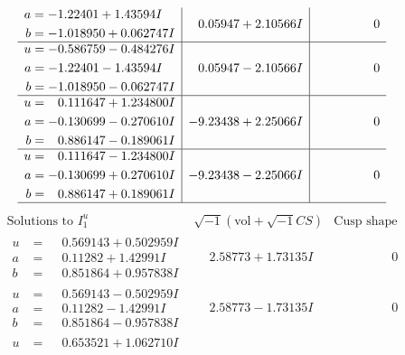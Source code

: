 \documentclass[1p]{elsarticle_modified}
\theoremstyle{definition}
\newcommand{\I}{\sqrt{-1}}
\begin{document}
$$\begin{array}{c|c|c}
\begin{aligned}
a &= -1.22401 + 1.43594 I \\
b &= -1.018950 + 0.062747 I\end{aligned}
 & \phantom{-}0.05947 + 2.10566 I & \phantom{-0.000000 } 0 \\ \hline\begin{aligned}
u &= -0.586759 - 0.484276 I \\
a &= -1.22401 - 1.43594 I \\
b &= -1.018950 - 0.062747 I\end{aligned}
 & \phantom{-}0.05947 - 2.10566 I & \phantom{-0.000000 } 0 \\ \hline\begin{aligned}
u &= \phantom{-}0.111647 + 1.234800 I \\
a &= -0.130699 - 0.270610 I \\
b &= \phantom{-}0.886147 - 0.189061 I\end{aligned}
 & -9.23438 + 2.25066 I & \phantom{-0.000000 } 0 \\ \hline\begin{aligned}
u &= \phantom{-}0.111647 - 1.234800 I \\
a &= -0.130699 + 0.270610 I \\
b &= \phantom{-}0.886147 + 0.189061 I\end{aligned}
 & -9.23438 - 2.25066 I & \phantom{-0.000000 } 0\\
 \hline 
 \end{array}$$\newpage$$\begin{array}{c|c|c}  
\text{Solutions to }I^u_{1}& \I (\text{vol} + \sqrt{-1}CS) & \text{Cusp shape}\\
 \hline 
\begin{aligned}
u &= \phantom{-}0.569143 + 0.502959 I \\
a &= \phantom{-}0.11282 + 1.42991 I \\
b &= \phantom{-}0.851864 + 0.957838 I\end{aligned}
 & \phantom{-}2.58773 + 1.73135 I & \phantom{-0.000000 } 0 \\ \hline\begin{aligned}
u &= \phantom{-}0.569143 - 0.502959 I \\
a &= \phantom{-}0.11282 - 1.42991 I \\
b &= \phantom{-}0.851864 - 0.957838 I\end{aligned}
 & \phantom{-}2.58773 - 1.73135 I & \phantom{-0.000000 } 0 \\ \hline\begin{aligned}
u &= \phantom{-}0.653521 + 1.062710 I \\

\end{aligned}
\end{array}$$
\end{document}
